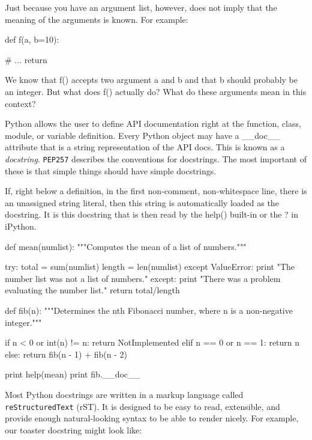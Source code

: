 Just because you have an argument list, however, does not imply that the meaning of the arguments is known. For example\+:

\begin{DoxyVerb}def f(a, b=10):

    # ...
    return
\end{DoxyVerb}


We know that {\ttfamily f()} accepts two argument {\ttfamily a} and {\ttfamily b} and that {\ttfamily b} should probably be an integer. But what does {\ttfamily f()} actually do? What do these arguments mean in this context?

Python allows the user to define A\+PI documentation right at the function, class, module, or variable definition. Every Python object may have a {\ttfamily \+\_\+\+\_\+doc\+\_\+\+\_\+} attribute that is a string representation of the A\+PI docs. This is known as a {\itshape docstring}. {\tt P\+E\+P257} describes the conventions for docstrings. The most important of these is that simple things should have simple docstrings.

If, right below a definition, in the first non-\/comment, non-\/whitespace line, there is an unassigned string literal, then this string is automatically loaded as the docstring. It is this docstring that is then read by the {\ttfamily help()} built-\/in or the {\ttfamily ?} in i\+Python.

\begin{DoxyVerb}def mean(numlist):
    """Computes the mean of a list of numbers."""

    try:
        total = sum(numlist)
        length = len(numlist)
    except ValueError:
        print "The number list was not a list of numbers."
    except:
        print "There was a problem evaluating the number list."
    return total/length


def fib(n):
    """Determines the nth Fibonacci number, where n is 
    a non-negative integer."""

    if n < 0 or int(n) != n:
        return NotImplemented
    elif n == 0 or n == 1:
        return n
    else:
        return fib(n - 1) + fib(n - 2)

print help(mean)
print fib.__doc__
\end{DoxyVerb}


Most Python docstrings are written in a markup language called {\tt re\+Structured\+Text} (r\+ST). It is designed to be easy to read, extensible, and provide enough natural-\/looking syntax to be able to render nicely. For example, our toaster docstring might look like\+:

